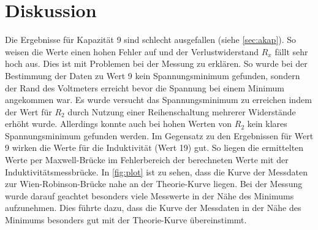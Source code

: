\section{Diskussion}
\label{sec:Diskussion}

Die Ergebnisse für Kapazität 9 sind schlecht ausgefallen (siehe \autoref{sec:akap}). So weisen die Werte einen hohen Fehler auf und der Verlustwiderstand $R_x$ fällt sehr hoch aus. Dies ist mit Problemen bei der Messung zu erklären. So wurde bei der Bestimmung der Daten zu Wert 9 kein Spannungsminimum gefunden, sondern der Rand des Voltmeters erreicht bevor die Spannung bei einem Minimum angekommen war. Es wurde versucht das Spannungsminimum zu erreichen indem der Wert für $R_2$ durch Nutzung einer Reihenschaltung mehrerer Widerstände erhöht wurde. Allerdings konnte auch bei hohen Werten von $R_2$ kein klares Spannungsminimum gefunden werden.\newline
Im Gegensatz zu den Ergebnissen für Wert 9 wirken die Werte für die Induktivität (Wert 19) gut. So liegen die ermittelten Werte per Maxwell-Brücke im Fehlerbereich der berechneten Werte mit der Induktivitätsmessbrücke.\newline
In \autoref{fig:plot} ist zu sehen, dass die Kurve der Messdaten zur Wien-Robinson-Brücke nahe an der Theorie-Kurve liegen. Bei der Messung wurde darauf geachtet besonders viele Messwerte in der Nähe des Minimums aufzunehmen. Dies führte dazu, dass die Kurve der Messdaten in der Nähe des Minimums besonders gut mit der Theorie-Kurve übereinstimmt. 